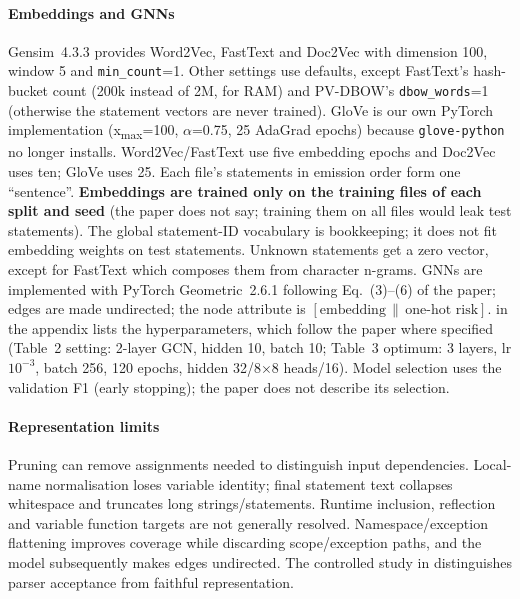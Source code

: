 \paragraph{Embeddings and GNNs}
Gensim~4.3.3 provides Word2Vec, FastText and Doc2Vec with dimension 100, window 5 and
\texttt{min\_count}=1. Other settings use defaults, except FastText's hash-bucket count (200k instead of 2M, for RAM) and PV-DBOW's
\texttt{dbow\_words}=1 (otherwise the statement vectors are never trained). GloVe is our own PyTorch implementation
(x\textsubscript{max}=100, $\alpha$=0.75, 25 AdaGrad epochs) because \texttt{glove-python} no longer installs.
Word2Vec/FastText use five embedding epochs and Doc2Vec uses ten; GloVe uses 25.
Each file's statements in emission order form one ``sentence''. \textbf{Embeddings are trained only on the training
files of each split and seed} (the paper does not say; training them on all files would leak test statements).
The global statement-ID vocabulary is bookkeeping; it does not fit embedding weights on test statements.
Unknown statements get a zero vector, except for FastText which composes them from character n-grams.
GNNs are implemented with PyTorch Geometric~2.6.1 following Eq.~(3)--(6) of the paper; edges are made undirected;
the node attribute is \([\text{embedding} \,\|\, \text{one-hot risk}]\).
 in the appendix lists the hyperparameters, which follow the paper where specified (Table~2 setting:
2-layer GCN, hidden 10, batch 10; Table~3 optimum: 3 layers, lr $10^{-3}$, batch 256, 120 epochs, hidden 32/8$\times$8 heads/16).
Model selection uses the validation F1 (early stopping); the paper does not describe its selection.

\paragraph{Representation limits}
Pruning can remove assignments needed to distinguish input dependencies. Local-name normalisation loses variable
identity; final statement text collapses whitespace and truncates long strings/statements. Runtime inclusion,
reflection and variable function targets are not generally resolved. Namespace/exception flattening improves
coverage while discarding scope/exception paths, and the model subsequently makes edges undirected.
The controlled study in  distinguishes parser acceptance from faithful representation.
